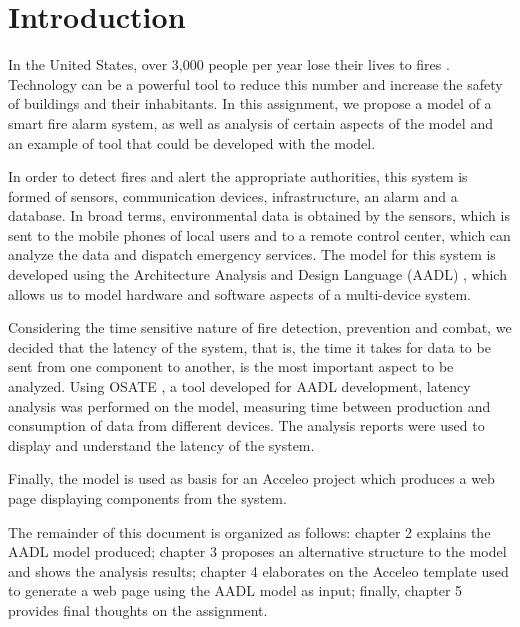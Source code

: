\section{Introduction}



In the United States, over 3,000 people per year lose their lives to fires \cite{usfiredeaths}. Technology can be a powerful tool to reduce this number and increase the safety of buildings and their inhabitants. In this assignment, we propose a model of a smart fire alarm system, as well as analysis of certain aspects of the model and an example of tool that could be developed with the model.

In order to detect fires and alert the appropriate authorities, this system is formed of sensors, communication devices, infrastructure, an alarm and a database. In broad terms, environmental data is obtained by the sensors, which is sent to the mobile phones of local users and to a remote control center, which can analyze the data and dispatch emergency services. The model for this system is developed using the Architecture Analysis and Design Language (AADL) \cite{aadl}, which allows us to model hardware and software aspects of a multi-device system.

Considering the time sensitive nature of fire detection, prevention and combat, we decided that the latency of the system, that is, the time it takes for data to be sent from one component to another, is the most important aspect to be analyzed. Using OSATE \cite{osate}, a tool developed for AADL development, latency analysis was performed on the model, measuring time between production and consumption of data from different devices. The analysis reports were used to display and understand the latency of the system.

Finally, the model is used as basis for an Acceleo \cite{acceleo} project which produces a web page displaying components from the system.

The remainder of this document is organized as follows: chapter 2 explains the AADL model produced; chapter 3 proposes an alternative structure to the model and shows the analysis results; chapter 4 elaborates on the Acceleo template used to generate a web page using the AADL model as input; finally, chapter 5 provides final thoughts on the assignment.

